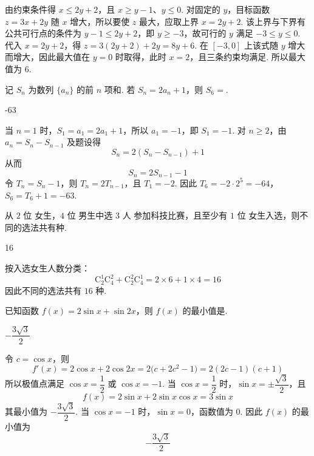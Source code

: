 \begin{solution}
由约束条件得 \(x\le2y+2\)，且 \(x\ge y-1\)、\(y\le0\). 对固定的 \(y\)，目标函数 \(z=3x+2y\) 随 \(x\) 增大，所以要使 \(z\) 最大，应取上界 \(x=2y+2\). 该上界与下界有公共可行点的条件为 \(y-1\le2y+2\)，即 \(y\ge-3\)，故可行的 \(y\) 满足 \(-3\le y\le0\).
代入 \(x=2y+2\)，得 \(z=3(2y+2)+2y=8y+6\). 在 \([-3,0]\) 上该式随 \(y\) 增大而增大，因此最大值在 \(y=0\) 时取得，此时 \(x=2\)，且三条约束均满足. 所以最大值为 \(6\).
\end{solution}

\begin{problem}
记 \(S_n\) 为数列 \(\{a_n\}\) 的前 \(n\) 项和. 若 \(S_n=2a_n+1\)，则 \(S_6=\)\fillinblank{}.
\end{problem}

\begin{answer}
-63
\end{answer}

\begin{solution}
当 \(n=1\) 时，\(S_1=a_1=2a_1+1\)，所以 \(a_1=-1\)，即 \(S_1=-1\). 对 \(n\ge2\)，由 \(a_n=S_n-S_{n-1}\) 及题设得
\[
S_n=2(S_n-S_{n-1})+1
\]
从而
\[
S_n=2S_{n-1}-1
\]
令 \(T_n=S_n-1\)，则 \(T_n=2T_{n-1}\)，且 \(T_1=-2\). 因此
\(T_6=-2\cdot2^5=-64\)，\(S_6=T_6+1=-63\).
\end{solution}

\begin{problem}
从 \(2\text{ 位}\) 女生，\(4\text{ 位}\) 男生中选 \(3\text{ 人}\) 参加科技比赛，且至少有 \(1\text{ 位}\) 女生入选，则不同的选法共有\fillinblank{}\(\text{种}\).
\end{problem}

\begin{answer}
16
\end{answer}

\begin{solution}
按入选女生人数分类：
\[
\mathrm C_2^1\mathrm C_4^2+\mathrm C_2^2\mathrm C_4^1
 =2\times6+1\times4=16
\]
因此不同的选法共有 \(16\) 种.
\end{solution}

\begin{problem}
已知函数 \(f(x)=2\sin x+\sin2x\)，则 \(f(x)\) 的最小值是\fillinblank{}.
\end{problem}

\begin{answer}
\(-\dfrac{3\sqrt3}{2}\)
\end{answer}

\begin{solution}
令 \(c=\cos x\)，则
\[
f'(x)=2\cos x+2\cos2x
 =2\bigl(c+2c^2-1\bigr)=2(2c-1)(c+1)
\]
所以极值点满足 \(\cos x=\dfrac12\) 或 \(\cos x=-1\). 当 \(\cos x=\dfrac12\) 时，\(\sin x=\pm\dfrac{\sqrt3}{2}\)，且
\[
f(x)=2\sin x+2\sin x\cos x=3\sin x
\]
其最小值为 \(-\dfrac{3\sqrt3}{2}\). 当 \(\cos x=-1\) 时，\(\sin x=0\)，函数值为 \(0\). 因此 \(f(x)\) 的最小值为
\[
-\frac{3\sqrt3}{2}
\]
\end{solution}

